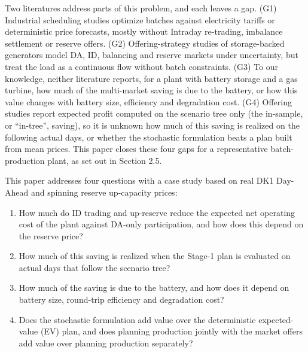 \documentclass[5p,times,twocolumn]{elsarticle}
\begin{document}
Two literatures address parts of this problem, and each leaves a gap. (G1) Industrial scheduling studies optimize batches against electricity tariffs or deterministic price forecasts, mostly without Intraday re-trading, imbalance settlement or reserve offers. (G2) Offering-strategy studies of storage-backed generators model DA, ID, balancing and reserve markets under uncertainty, but treat the load as a continuous flow without batch constraints. (G3) To our knowledge, neither literature reports, for a plant with battery storage and a gas turbine, how much of the multi-market saving is due to the battery, or how this value changes with battery size, efficiency and degradation cost. (G4) Offering studies report expected profit computed on the scenario tree only (the in-sample, or “in-tree”, saving), so it is unknown how much of this saving is realized on the following actual days, or whether the stochastic formulation beats a plan built from mean prices. This paper closes these four gaps for a representative batch-production plant, as set out in Section 2.5.

This paper addresses four questions with a case study based on real DK1 Day-Ahead and spinning reserve up-capacity prices:
\begin{enumerate}
    \item[\textbf{Q1}] How much do ID trading and up-reserve reduce the expected net operating cost of the plant against DA-only participation, and how does this depend on the reserve price?
    \item[\textbf{Q2}] How much of this saving is realized when the Stage-1 plan is evaluated on actual days that follow the scenario tree?
    \item[\textbf{Q3}] How much of the saving is due to the battery, and how does it depend on battery size, round-trip efficiency and degradation cost?
    \item[\textbf{Q4}]  Does the stochastic formulation add value over the deterministic expected-value (EV) plan, and does planning production jointly with the market offers add value over planning production separately?
\end{enumerate}
\end{document}
